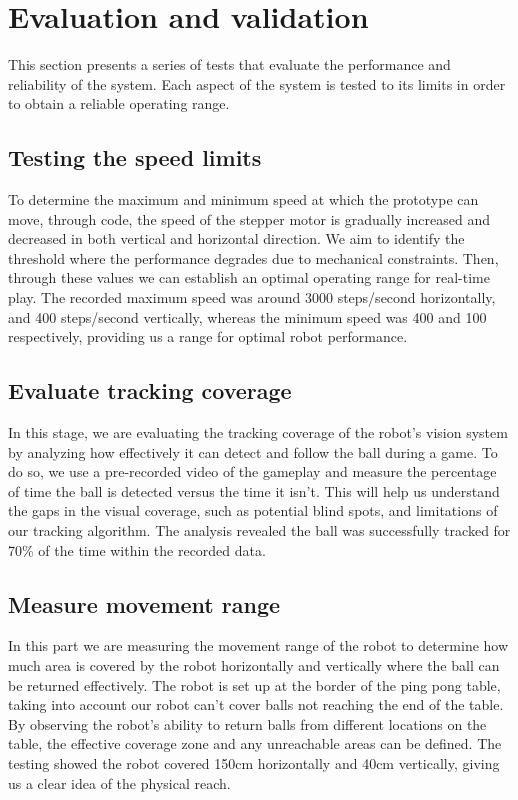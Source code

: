 \chapter{Evaluation and validation}
This section presents a series of tests that evaluate the performance and reliability of the system. Each aspect of the system is tested to its limits in order to obtain a reliable operating range.
\section{Testing the speed limits}
To determine the maximum and minimum speed at which the prototype can move, through code, the speed of the stepper motor is gradually increased and decreased in both vertical and horizontal direction. 
We aim to identify the threshold where the performance degrades due to mechanical constraints. 
Then, through these values we can establish an optimal operating range for real-time play. 
The recorded maximum speed was around 3000 steps/second horizontally, and 400 steps/second vertically, whereas the minimum speed was 400 and 100 respectively, providing us a range for optimal robot performance.

\section{Evaluate tracking coverage}
In this stage, we are evaluating the tracking coverage of the robot's vision system by analyzing how effectively it can detect and follow the ball during a game. 
To do so, we use a pre-recorded video of the gameplay and measure the percentage of time the ball is detected versus the time it isn't. 
This will help us understand the gaps in the visual coverage, such as potential blind spots, and limitations of our tracking algorithm. 
The analysis revealed the ball was successfully tracked for 70\% of the time within the recorded data.

\section{Measure movement range}
In this part we are measuring the movement range of the robot to determine how much area is covered by the robot horizontally and vertically where the ball can be returned effectively. 
The robot is set up at the border of the ping pong table, taking into account our robot can't cover balls not reaching the end of the table. 
By observing the robot's ability to return balls from different locations on the table, the effective coverage zone and any unreachable areas can be defined. 
The testing showed the robot covered 150cm horizontally and 40cm vertically, giving us a clear idea of the physical reach.

